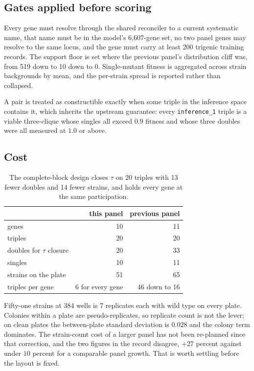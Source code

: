\subsection{Gates applied before scoring}

Every gene must resolve through the shared reconciler to a current systematic
name, that name must be in the model's 6{,}607-gene set, no two panel genes may
resolve to the same locus, and the gene must carry at least 200 trigenic
training records. The support floor is set where the previous panel's
distribution cliff was, from 519 down to 10 down to 0. Single-mutant fitness is
aggregated across strain backgrounds by mean, and the per-strain spread is
reported rather than collapsed.

A pair is treated as constructible exactly when some triple in the inference
space contains it, which inherits the upstream guarantee: every
\texttt{inference\_1} triple is a viable three-clique whose singles all exceed
$0.9$ fitness and whose three doubles were all measured at $1.0$ or above.

\subsection{Cost}

\begin{table}[H]
\centering
\begin{tabular}{lrr}
\toprule
& this panel & previous panel \\
\midrule
genes                       & 10 & 11 \\
triples                     & 20 & 20 \\
doubles for $\tau$ closure  & 20 & 33 \\
singles                     & 10 & 11 \\
strains on the plate        & 51 & 65 \\
triples per gene            & 6 for every gene & 46 down to 16 \\
\bottomrule
\end{tabular}
\caption{The complete-block design closes $\tau$ on 20 triples with 13 fewer
doubles and 14 fewer strains, and holds every gene at the same participation.}
\end{table}

Fifty-one strains at 384 wells is 7 replicates each with wild type on every
plate. Colonies within a plate are pseudo-replicates, so replicate count is not
the lever; on clean plates the between-plate standard deviation is $0.028$ and
the colony term dominates. The strain-count cost of a larger panel has not been
re-planned since that correction, and the two figures in the record disagree,
$+27$ percent against under $10$ percent for a comparable panel growth. That is
worth settling before the layout is fixed.
